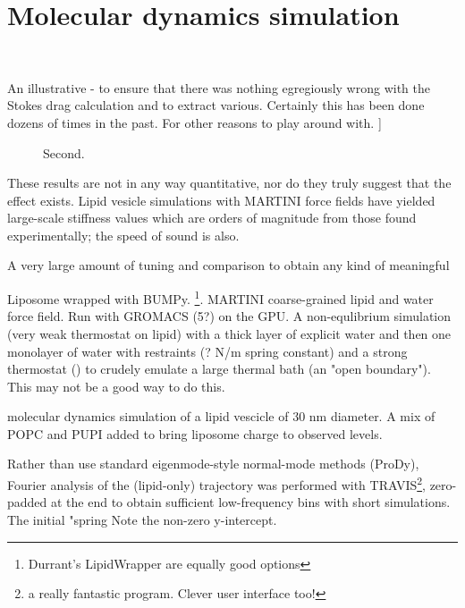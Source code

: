 \documentclass[paper.tex]{subfiles}
\begin{document}
\section{Molecular dynamics simulation}
\


An illustrative - to ensure that there was nothing egregiously wrong with the Stokes drag calculation and to extract various. Certainly this has been done dozens of times in the past. For other reasons to play around with. ]\

\begin{figure}[H]
	\centering
	\hfill
		\caption{Second.}
		
\end{figure}

These results are not in any way quantitative, nor do they truly suggest that the effect exists. Lipid vesicle simulations with MARTINI force fields have yielded large-scale stiffness values which are orders of magnitude\cite{Determining2014} from those found experimentally; the speed of sound is also. 

A very large amount of tuning and comparison  to obtain any kind of meaningful  



Liposome wrapped with BUMPy\cite{BUMPy2018}. \footnote{Durrant's LipidWrapper are equally good options}. MARTINI 
coarse-grained 
lipid and water force field. Run with GROMACS (5?) on the GPU. A non-equlibrium simulation (very weak thermostat on lipid) with a thick layer of explicit water and then one monolayer of water with restraints (? N/m spring constant) and a strong thermostat () to crudely emulate a large thermal bath (an "open boundary"). This may not be a good way to do this.

molecular dynamics simulation of a lipid vescicle of 30 nm diameter. A mix of POPC and PUPI added to bring liposome charge to 
observed levels.

Rather than use standard eigenmode-style normal-mode methods (ProDy), Fourier analysis of the (lipid-only) trajectory was performed with TRAVIS\footnote{a really fantastic program. Clever user interface too!}, zero-padded at the end to obtain sufficient low-frequency bins with short simulations. The initial "spring Note the non-zero y-intercept. 
\end{document}
